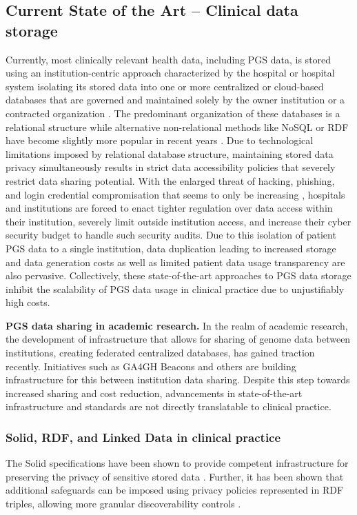 \documentclass[runningheads]{llncs}
\begin{document}
\subsection{Current State of the Art -- Clinical data storage}
Currently, most clinically relevant health data, including PGS data, is stored using an institution-centric approach characterized by the hospital or hospital system isolating its stored data into one or more centralized or cloud-based databases that are governed and maintained solely by the owner institution or a contracted organization \cite{quantin_medical_2011}. 
The predominant organization of these databases is a relational structure while alternative non-relational methods like NoSQL or RDF have become slightly more popular in recent years \cite{kotsilieris_efficient_2021}.
Due to technological limitations imposed by relational database structure, maintaining stored data privacy simultaneously results in strict data accessibility policies that severely restrict data sharing potential.
With the enlarged threat of hacking, phishing, and login credential compromisation that seems to only be increasing \cite{noauthor_ransomware_nodate}, hospitals and institutions are forced to enact tighter regulation over data access within their institution, severely limit outside institution access, and increase their cyber security budget to handle such security audits.  
Due to this isolation of patient PGS data to a single institution, data duplication leading to increased storage and data generation costs as well as limited patient data usage transparency are also pervasive.
Collectively, these state-of-the-art approaches to PGS data storage inhibit the scalability of PGS data usage in clinical practice due to unjustifiably high costs.

\textbf{PGS data sharing in academic research.}
In the realm of academic research, the development of infrastructure that allows for sharing of genome data between institutions, creating federated centralized databases, has gained traction recently. 
Initiatives such as GA4GH Beacons \cite{rambla_beacon_2022} and others are building infrastructure for this between institution data sharing. 
Despite this step towards increased sharing and cost reduction, advancements in state-of-the-art infrastructure and standards are not directly translatable to clinical practice. 

\subsubsection{Solid, RDF, and Linked Data in clinical practice}
The Solid specifications have been shown to provide competent infrastructure for preserving the privacy of sensitive stored data \cite{esposito_assessing_2022}.
Further, it has been shown that additional safeguards can be imposed using privacy policies represented in RDF triples, allowing more granular discoverability controls \cite{benaribi_sparql-based_2023}. 
\end{document}
